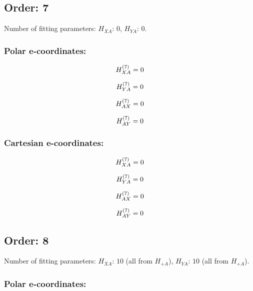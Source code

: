 \documentclass[fleqn]{article}
\begin{document}
\subsection{Order: 7}
Number of fitting parameters: $H_{XA}$: $0$, $H_{YA}$: $0$.
\subsubsection*{Polar e-coordinates:}

\begin{dmath*}
H_{XA}^{(7)}=0\\
\end{dmath*}

\begin{dmath*}
H_{YA}^{(7)}=0\\
\end{dmath*}

\begin{dmath*}
H_{AX}^{(7)}=0\\
\end{dmath*}

\begin{dmath*}
H_{AY}^{(7)}=0\\
\end{dmath*}
\subsubsection*{Cartesian e-coordinates:}

\begin{dmath*}
H_{XA}^{(7)}=0\\
\end{dmath*}

\begin{dmath*}
H_{YA}^{(7)}=0\\
\end{dmath*}

\begin{dmath*}
H_{AX}^{(7)}=0\\
\end{dmath*}

\begin{dmath*}
H_{AY}^{(7)}=0\\
\end{dmath*}
\subsection{Order: 8}
Number of fitting parameters: $H_{XA}$: $10$ (all from $H_{+A}$), $H_{YA}$: $10$ (all from $H_{+A}$).
\subsubsection*{Polar e-coordinates:}
\end{document}
